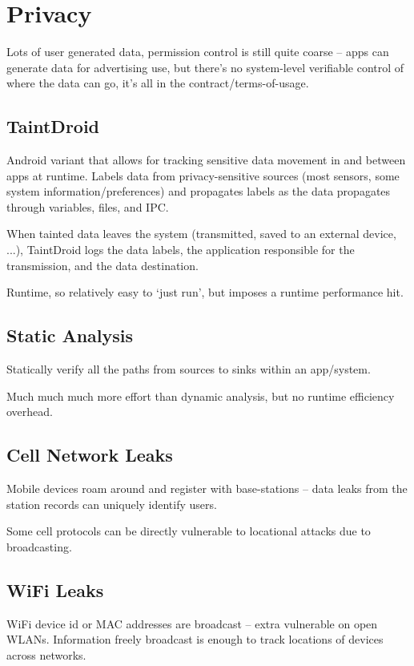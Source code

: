 \documentclass[a4paper, 11pt]{article}
\begin{document}
\section*{Privacy}
{
    Lots of user generated data, permission control is still quite coarse -- apps can generate data for advertising use, but there's no system-level verifiable control of where the data can go, it's all in the contract/terms-of-usage.

    \subsection*{TaintDroid}
    {
        Android variant that allows for tracking sensitive data movement in and between apps at runtime. Labels data from privacy-sensitive sources (most sensors, some system information/preferences) and propagates labels as the data propagates through variables, files, and IPC.

        When tainted data leaves the system (transmitted, saved to an external device, ...), TaintDroid logs the data labels, the application responsible for the transmission, and the data destination.

        Runtime, so relatively easy to `just run', but imposes a runtime performance hit.
    }
    \subsection*{Static Analysis}
    {
        Statically verify all the paths from sources to sinks within an app/system.

        Much much much more effort than dynamic analysis, but no runtime efficiency overhead.
    }
    \subsection*{Cell Network Leaks}
    {
        Mobile devices roam around and register with base-stations -- data leaks from the station records can uniquely identify users.

        Some cell protocols can be directly vulnerable to locational attacks due to broadcasting.
    }
    \subsection*{WiFi Leaks}
    {
        WiFi device id or MAC addresses are broadcast -- extra vulnerable on open WLANs. Information freely broadcast is enough to track locations of devices across networks.

}}
\end{document}
